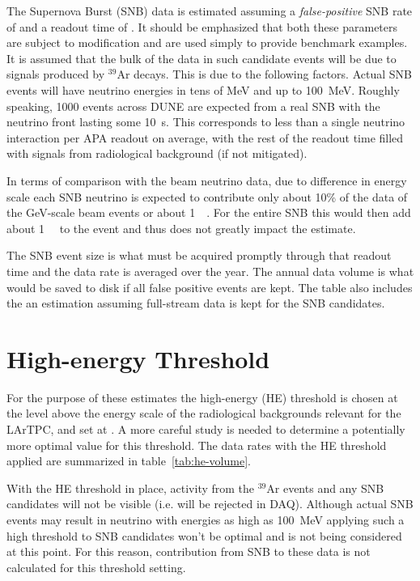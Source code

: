 The Supernova Burst (SNB) data is estimated assuming a \textit{false-positive} SNB
rate of \snbcandrate and a readout time of \snbreadouttime.
It should be emphasized that both these parameters are subject to
modification and are used simply to provide benchmark examples.
It is assumed that the bulk of the data in such candidate events will be due to signals produced by $^{39}$Ar decays.
This is due to the following factors.
Actual SNB events will have neutrino energies in tens of MeV and up to
\SI{100}{\MeV}.
Roughly speaking, 1000 events across DUNE are expected from a real SNB
with the neutrino front lasting some \SI{10}{\second}. This corresponds to less
than a single neutrino interaction per APA readout on average, with the rest of the readout time
filled with signals from radiological background (if not mitigated).

In terms of comparison with the beam neutrino data, 
due to difference in energy scale each SNB neutrino is expected to contribute only
about 10\% of the data of the
\si{\GeV}-scale beam events or about \SI{1}{\mega\byte}.
For the entire SNB this would then add about \SI{1}{\giga\byte} to the
event and thus does not greatly impact the estimate.

The SNB event size is what must be acquired promptly through that
readout time and the data rate is averaged over the year.
The annual data volume is what would be saved to disk if all false
positive events are kept.
The table also includes the an estimation assuming full-stream data is
kept for the SNB candidates.

\section{High-energy Threshold}

For the purpose of these estimates the  high-energy (HE) threshold is chosen at the level above 
the energy scale of the radiological backgrounds relevant for the LArTPC, and set at  \chargehethreshold.
A more careful study is needed to determine a potentially more optimal value for this threshold.
The data rates with the HE threshold applied are summarized in table~\ref{tab:he-volume}.



With the HE threshold in place, activity from the $^{39}$Ar events and any SNB
candidates will not be visible (i.e. will be rejected in DAQ).
Although actual SNB events may result in neutrino with energies as high as
\SI{100}{\MeV} applying such a high threshold to SNB candidates won't be optimal and is not being considered at this point.
For this reason, contribution from SNB to these data is not calculated for this threshold setting.


